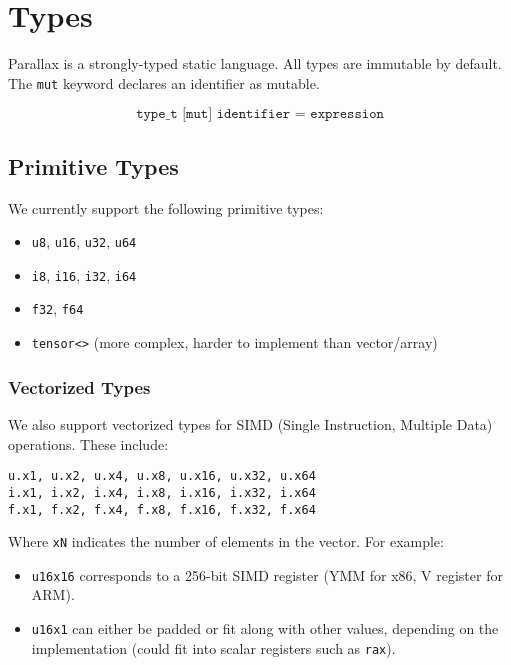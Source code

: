 \documentclass{article}
\begin{document}
\section{Types}
Parallax is a strongly-typed static language. All types are immutable by default. The \texttt{mut} keyword declares an identifier as mutable.

\[
\texttt{type\_t [mut] identifier = expression}
\]

\subsection{Primitive Types}

We currently support the following primitive types:

\begin{multicols}{2}
    \begin{itemize}
        \item \texttt{u8}, \texttt{u16}, \texttt{u32}, \texttt{u64}
        \item \texttt{i8}, \texttt{i16}, \texttt{i32}, \texttt{i64}
        \item \texttt{f32}, \texttt{f64}
        \item \texttt{tensor<>} (more complex, harder to implement than vector/array)
    \end{itemize}
\end{multicols}

\subsubsection{Vectorized Types}

We also support vectorized types for SIMD (Single Instruction, Multiple Data) operations. These include:

\begin{lstlisting}[basicstyle=\ttfamily]
u.x1, u.x2, u.x4, u.x8, u.x16, u.x32, u.x64
i.x1, i.x2, i.x4, i.x8, i.x16, i.x32, i.x64
f.x1, f.x2, f.x4, f.x8, f.x16, f.x32, f.x64
\end{lstlisting}

Where \texttt{xN} indicates the number of elements in the vector. For example:
\begin{itemize}
    \item \texttt{u16x16} corresponds to a 256-bit SIMD register (YMM for x86, V register for ARM).
    \item \texttt{u16x1} can either be padded or fit along with other values, depending on the implementation (could fit into scalar registers such as \texttt{rax}).
\end{itemize}
\end{document}
